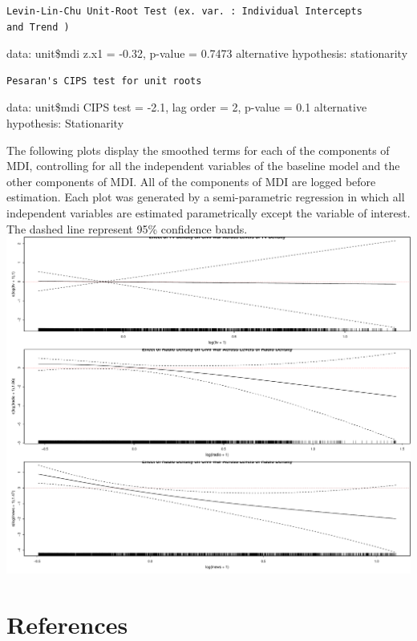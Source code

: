 \documentclass[11pt,article,oneside]{memoir}
\makeatletter
\def\maxwidth{\ifdim\Gin@nat@width>\linewidth\linewidth
\else\Gin@nat@width\fi}
\let\Oldincludegraphics\includegraphics
\renewcommand{\includegraphics}[1]{\Oldincludegraphics[width=\maxwidth]{#1}}
\makeatother
\begin{document}
\begin{verbatim}
Levin-Lin-Chu Unit-Root Test (ex. var. : Individual Intercepts
and Trend )
\end{verbatim}

data: unit\$mdi z.x1 = -0.32, p-value = 0.7473 alternative hypothesis:
stationarity

\begin{verbatim}
Pesaran's CIPS test for unit roots
\end{verbatim}

data: unit\$mdi CIPS test = -2.1, lag order = 2, p-value = 0.1
alternative hypothesis: Stationarity

The following plots display the smoothed terms for each of the
components of MDI, controlling for all the independent variables of the
baseline model and the other components of MDI. All of the components of
MDI are logged before estimation. Each plot was generated by a
semi-parametric regression in which all independent variables are
estimated parametrically except the variable of interest. The dashed
line represent 95\% confidence bands.
\includegraphics{figure/disaggregated-nonlinear.pdf} \pagebreak   

\section{References}\label{references}

\setlength{\parindent}{-0.2in} \setlength{\leftskip}{0.2in}
\setlength{\parskip}{8pt} \vspace*{-0.2in} \noindent
\end{document}
